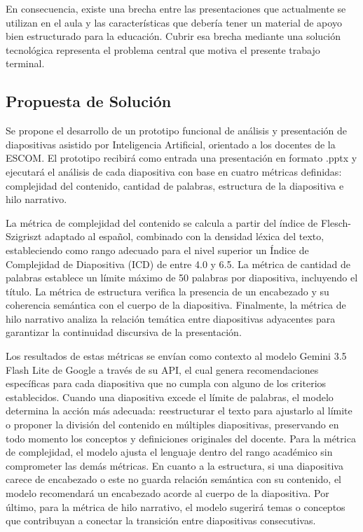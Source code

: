 \documentclass[11pt]{article}
\begin{document}
En consecuencia, existe una brecha entre las presentaciones que actualmente se utilizan en el aula y las características que debería tener un material de apoyo bien estructurado para la educación. Cubrir esa brecha mediante una solución tecnológica representa el problema central que motiva el presente trabajo terminal.


\subsection*{Propuesta de Solución}
Se propone el desarrollo de un prototipo funcional de análisis y presentación de diapositivas asistido por Inteligencia Artificial, orientado a los docentes de la ESCOM. El prototipo recibirá como entrada una presentación en formato .pptx y ejecutará el análisis de cada diapositiva con base en cuatro métricas definidas: complejidad del contenido, cantidad de palabras, estructura de la diapositiva e hilo narrativo.

La métrica de complejidad del contenido se calcula a partir del índice de Flesch-Szigriszt adaptado al español, combinado con la densidad léxica del texto, estableciendo como rango adecuado para el nivel superior un Índice de Complejidad de Diapositiva (ICD) de entre 4.0 y 6.5. La métrica de cantidad de palabras establece un límite máximo de 50 palabras por diapositiva, incluyendo el título. La métrica de estructura verifica la presencia de un encabezado y su coherencia semántica con el cuerpo de la diapositiva. Finalmente, la métrica de hilo narrativo analiza la relación temática entre diapositivas adyacentes para garantizar la continuidad discursiva de la presentación.

Los resultados de estas métricas se envían como contexto al modelo Gemini 3.5 Flash Lite de Google a través de su API, el cual genera recomendaciones específicas para cada diapositiva que no cumpla con alguno de los criterios establecidos. Cuando una diapositiva excede el límite de palabras, el modelo determina la acción más adecuada: reestructurar el texto para ajustarlo al límite o proponer la división del contenido en múltiples diapositivas, preservando en todo momento los conceptos y definiciones originales del docente. Para la métrica de complejidad, el modelo ajusta el lenguaje dentro del rango académico sin comprometer las demás métricas. En cuanto a la estructura, si una diapositiva carece de encabezado o este no guarda relación semántica con su contenido, el modelo recomendará un encabezado acorde al cuerpo de la diapositiva. Por último, para la métrica de hilo narrativo, el modelo sugerirá temas o conceptos que contribuyan a conectar la transición entre diapositivas consecutivas.
\end{document}
